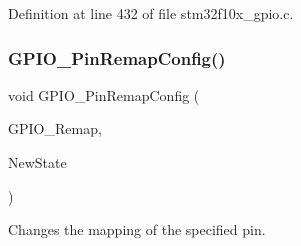 Definition at line 432 of file stm32f10x\+\_\+gpio.\+c.

\mbox{\label{group___g_p_i_o___private___functions_ga64eb76f6211b840daf9829289df4208b}} 
\subsubsection{\texorpdfstring{G\+P\+I\+O\+\_\+\+Pin\+Remap\+Config()}{GPIO\_PinRemapConfig()}}
{\footnotesize\ttfamily void G\+P\+I\+O\+\_\+\+Pin\+Remap\+Config (\begin{DoxyParamCaption}\item[{uint32\+\_\+t}]{G\+P\+I\+O\+\_\+\+Remap,  }\item[{\hyperlink{group___exported__types_gac9a7e9a35d2513ec15c3b537aaa4fba1}{Functional\+State}}]{New\+State }\end{DoxyParamCaption})}



Changes the mapping of the specified pin. 


